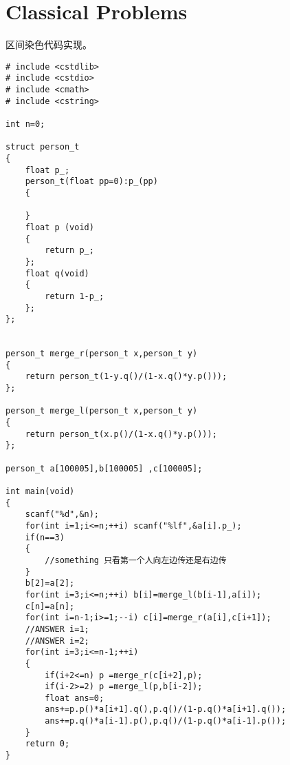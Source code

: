 \documentclass{article}
\newcommand{\romannum}[1]{\uppercase\expandafter{\romannumeral#1}}
\begin{document}
\section{Classical Problems}
区间染色\romannum{2}代码实现。
\begin{verbatim}
# include <cstdlib>
# include <cstdio>
# include <cmath>
# include <cstring>

int n=0;

struct person_t
{
	float p_;
	person_t(float pp=0):p_(pp)
	{

	}
	float p (void)
	{
		return p_;
	};
	float q(void)
	{
		return 1-p_;
	};
};


person_t merge_r(person_t x,person_t y)
{
	return person_t(1-y.q()/(1-x.q()*y.p()));
};

person_t merge_l(person_t x,person_t y)
{
	return person_t(x.p()/(1-x.q()*y.p()));
};

person_t a[100005],b[100005] ,c[100005];

int main(void)
{
	scanf("%d",&n);
	for(int i=1;i<=n;++i) scanf("%lf",&a[i].p_);
	if(n==3)
	{
	    //something 只看第一个人向左边传还是右边传
	}
	b[2]=a[2];
	for(int i=3;i<=n;++i) b[i]=merge_l(b[i-1],a[i]);
	c[n]=a[n];
	for(int i=n-1;i>=1;--i) c[i]=merge_r(a[i],c[i+1]);
	//ANSWER i=1;
	//ANSWER i=2;
	for(int i=3;i<=n-1;++i)
	{
		if(i+2<=n) p =merge_r(c[i+2],p);
		if(i-2>=2) p =merge_l(p,b[i-2]);
		float ans=0;
		ans+=p.p()*a[i+1].q(),p.q()/(1-p.q()*a[i+1].q());
		ans+=p.q()*a[i-1].p(),p.q()/(1-p.q()*a[i-1].p());
	}
	return 0;
}
\end{verbatim}
\end{document}

